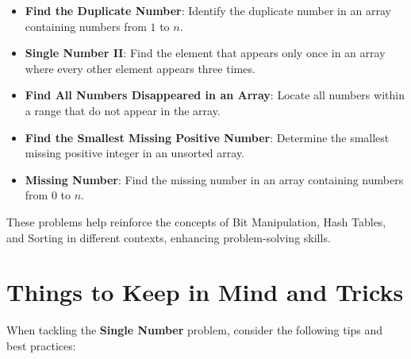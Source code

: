 \begin{itemize}
    \item \textbf{Find the Duplicate Number}: Identify the duplicate number in an array containing numbers from \(1\) to \(n\).
    \item \textbf{Single Number II}: Find the element that appears only once in an array where every other element appears three times.
    \item \textbf{Find All Numbers Disappeared in an Array}: Locate all numbers within a range that do not appear in the array.
    \item \textbf{Find the Smallest Missing Positive Number}: Determine the smallest missing positive integer in an unsorted array.
    \item \textbf{Missing Number}: Find the missing number in an array containing numbers from \(0\) to \(n\).
\end{itemize}

These problems help reinforce the concepts of Bit Manipulation, Hash Tables, and Sorting in different contexts, enhancing problem-solving skills.

\section*{Things to Keep in Mind and Tricks}

When tackling the \textbf{Single Number} problem, consider the following tips and best practices:

